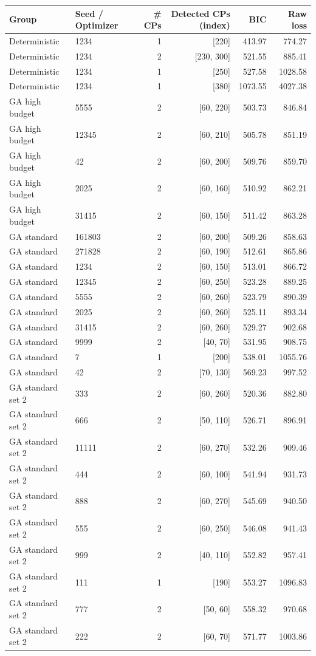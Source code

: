 \begin{tabular}{llrrrr}
\hline
Group & Seed / Optimizer & \# CPs & Detected CPs (index) & BIC & Raw loss \\
\hline
Deterministic & 1234 & 1 & [220] & 413.97 & 774.27 \\
Deterministic & 1234 & 2 & [230, 300] & 521.55 & 885.41 \\
Deterministic & 1234 & 1 & [250] & 527.58 & 1028.58 \\
Deterministic & 1234 & 1 & [380] & 1073.55 & 4027.38 \\
GA high budget & 5555 & 2 & [60, 220] & 503.73 & 846.84 \\
GA high budget & 12345 & 2 & [60, 210] & 505.78 & 851.19 \\
GA high budget & 42 & 2 & [60, 200] & 509.76 & 859.70 \\
GA high budget & 2025 & 2 & [60, 160] & 510.92 & 862.21 \\
GA high budget & 31415 & 2 & [60, 150] & 511.42 & 863.28 \\
GA standard & 161803 & 2 & [60, 200] & 509.26 & 858.63 \\
GA standard & 271828 & 2 & [60, 190] & 512.61 & 865.86 \\
GA standard & 1234 & 2 & [60, 150] & 513.01 & 866.72 \\
GA standard & 12345 & 2 & [60, 250] & 523.28 & 889.25 \\
GA standard & 5555 & 2 & [60, 260] & 523.79 & 890.39 \\
GA standard & 2025 & 2 & [60, 260] & 525.11 & 893.34 \\
GA standard & 31415 & 2 & [60, 260] & 529.27 & 902.68 \\
GA standard & 9999 & 2 & [40, 70] & 531.95 & 908.75 \\
GA standard & 7 & 1 & [200] & 538.01 & 1055.76 \\
GA standard & 42 & 2 & [70, 130] & 569.23 & 997.52 \\
GA standard set 2 & 333 & 2 & [60, 260] & 520.36 & 882.80 \\
GA standard set 2 & 666 & 2 & [50, 110] & 526.71 & 896.91 \\
GA standard set 2 & 11111 & 2 & [60, 270] & 532.26 & 909.46 \\
GA standard set 2 & 444 & 2 & [60, 100] & 541.94 & 931.73 \\
GA standard set 2 & 888 & 2 & [60, 270] & 545.69 & 940.50 \\
GA standard set 2 & 555 & 2 & [60, 250] & 546.08 & 941.43 \\
GA standard set 2 & 999 & 2 & [40, 110] & 552.82 & 957.41 \\
GA standard set 2 & 111 & 1 & [190] & 553.27 & 1096.83 \\
GA standard set 2 & 777 & 2 & [50, 60] & 558.32 & 970.68 \\
GA standard set 2 & 222 & 2 & [60, 70] & 571.77 & 1003.86 \\
\hline
\end{tabular}
